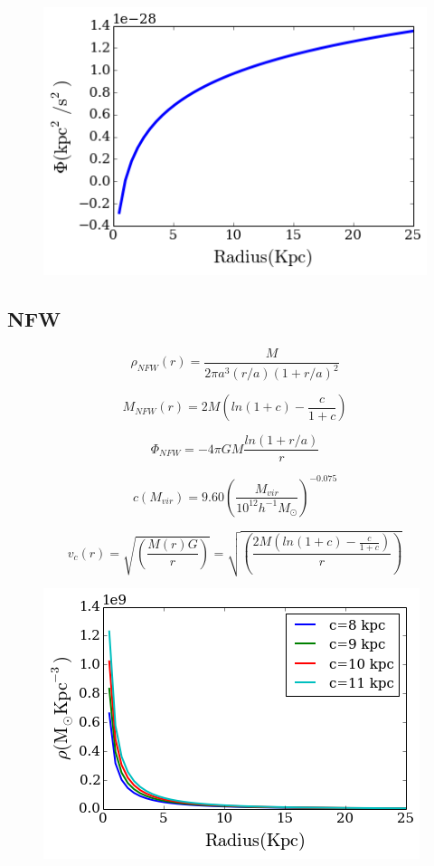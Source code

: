 \documentclass[a4paper, 12pt]{article} %
\begin{document}
\begin{figure}[H]
\centering
\includegraphics[scale=0.7]{sis_phi.png}
\end{figure}


\subsection{NFW}


\begin{equation}
\rho_{NFW}(r) = \dfrac{M}{2\pi a^3(r/a) (1 + r/a)^2}
\end{equation}


\begin{equation}
M_{NFW}(r) = 2 M  \left(  ln(1 + c) - \frac{c}{1 + c} \right)
\end{equation}

\begin{equation}
\Phi_{NFW} = -4\pi G M \frac{ln(1 + r/a)}{r}
\end{equation}

\begin{equation}
c(M_{vir}) = 9.60  \left( \frac{M_{vir}}{10^{12}h^{-1}M_{\odot}} \right)^{-0.075}
\end{equation}



\begin{equation}
v_c(r) = \sqrt{\left(\dfrac{M(r)G}{r}\right)} = \sqrt{\left( \dfrac{2 M  \left(  ln(1 + c) - \frac{c}{1 + c} \right)}{r} \right)}
\end{equation}


\begin{figure}[H]
\centering
\includegraphics[scale=0.7]{NFW_density.png}
\end{figure}
\end{document}
